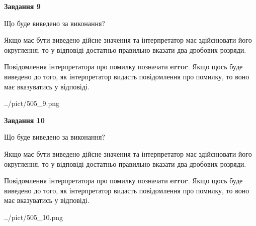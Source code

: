 \documentclass[12pt, ukrainian]{article}
\begin{document}
{\begin {Large}
{\begin {center}\textbf{Завдання 9}\end {center}}\par
Що буде виведено за виконання? \par

Якщо має бути виведено дійсне значення та інтерпретатор має здійснювати його округлення, 
то у відповіді достатньо правильно вказати два дробових розряди.

Повідомлення інтерпретатора про помилку позначати \textbf{error}.
Якщо щось буде виведено до того, як інтерпретатор видасть повідомлення про помилку, 
то воно має вказуватись у відповіді. \par

\begin{center}
	{../pict/505_9.png}
\end{center}
\newpage

{\begin {center}\textbf{Завдання 10}\end {center}}\par
Що буде виведено за виконання? \par

Якщо має бути виведено дійсне значення та інтерпретатор має здійснювати його округлення, 
то у відповіді достатньо правильно вказати два дробових розряди.

Повідомлення інтерпретатора про помилку позначати \textbf{error}.
Якщо щось буде виведено до того, як інтерпретатор видасть повідомлення про помилку, 
то воно має вказуватись у відповіді. \par

\begin{center}
	{../pict/505_10.png}
\end{center}
\newpage

\end {Large}}
\end{document}
